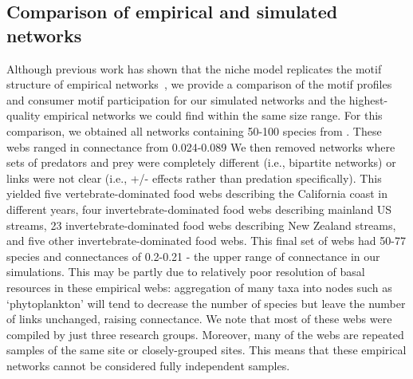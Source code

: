 \documentclass[12pt]{article}
\begin{document}
\begin{spacing}{2.0}
    \subsection*{Comparison of empirical and simulated networks}
    
    
        Although previous work has shown that the niche model replicates the motif structure of empirical networks~\citep{Stouffer2005a,Stouffer2006}, we provide a comparison of the motif profiles and consumer motif participation for our simulated networks and the highest-quality empirical networks we could find within the same size range.
        For this comparison, we obtained all networks containing 50-100 species from \citet{globalwebdb}.
        These webs ranged in connectance from 0.024-0.089
        We then removed networks where sets of predators and prey were completely different (i.e., bipartite networks) or links were not clear (i.e., +/- effects rather than predation specifically).
        This yielded five vertebrate-dominated food webs describing the California coast in different years, four invertebrate-dominated food webs describing mainland US streams, 23 invertebrate-dominated food webs describing New Zealand streams, and five other invertebrate-dominated food webs.
        This final set of webs had 50-77 species and connectances of 0.2-0.21 - the upper range of connectance in our simulations.
        This may be partly due to relatively poor resolution of basal resources in these empirical webs: aggregation of many taxa into nodes such as `phytoplankton' will tend to decrease the number of species but leave the number of links unchanged, raising connectance.
        We note that most of these webs were compiled by just three research groups.
        Moreover, many of the webs are repeated samples of the same site  or closely-grouped sites.
        This means that these empirical networks cannot be considered fully independent samples.
        

\end{spacing}
\end{document}
